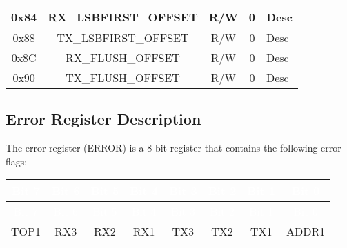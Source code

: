 \begin{longtable}{|c|c|c|c|p{}|}
    0x84 &
    RX\_LSBFIRST\_OFFSET &
    R/W &
    0 &
    Desc
    \\ \hline

    0x88 &
    TX\_LSBFIRST\_OFFSET &
    R/W &
    0 &
    Desc
    \\ \hline

    0x8C &
    RX\_FLUSH\_OFFSET &
    R/W &
    0 &
    Desc
    \\ \hline

    0x90 &
    TX\_FLUSH\_OFFSET &
    R/W &
    0 &
    Desc
    \\ \hline
\end{longtable}
\label{table:uart_register_map}
\endgroup

\subsection{Error Register Description}

The error register (ERROR) is a 8-bit register that contains the following error flags:
\renewcommand*{\arraystretch}{1.25}
\begingroup
\small
{}
\begin{longtable}{|c|c|c|c|c|c|c|c|}
    \hline
    \rowcolor{gray}
    \textcolor{white}{Bit 7} & \textcolor{white}{Bit 6} & \textcolor{white}{Bit 5} & \textcolor{white}{Bit 4} & \textcolor{white}{Bit 3} & \textcolor{white}{Bit 2} & \textcolor{white}{Bit 1} & \textcolor{white}{Bit 0} \\ \hline
    \endfirsthead

    \hline
    \rowcolor{gray}
    \textcolor{white}{Bit 7} & \textcolor{white}{Bit 6} & \textcolor{white}{Bit 5} & \textcolor{white}{Bit 4} & \textcolor{white}{Bit 3} & \textcolor{white}{Bit 2} & \textcolor{white}{Bit 1} & \textcolor{white}{Bit 0} \\ \hline
    \endhead

    \hline
    \endfoot

    TOP1 & RX3 & RX2 & RX1 & TX3 & TX2 & TX1 & ADDR1 \\ \hline
\end{longtable}
\label{table:uart_error}
\endgroup

